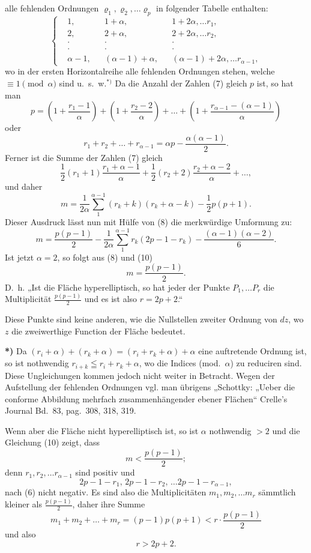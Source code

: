 \documentclass{article}
\begin{document}
alle fehlenden Ordnungen $\varrho_1, \varrho_2, \dots \varrho_p$ in folgender Tabelle enthalten:
\[
\left\{
\begin{aligned}
&1, & &1 + \alpha, & &1 + 2\alpha, \dots r_1, \\
&2, & &2 + \alpha, & &2 + 2\alpha, \dots r_2, \\
&\cdot & &\cdot & &\cdot \\
&\cdot & &\cdot & &\cdot \\
&\alpha - 1, & &(\alpha - 1) + \alpha, & &(\alpha - 1) + 2\alpha, \dots r_{\alpha-1},
\end{aligned}
\right.
\tag{7}
\]
wo in der ersten Horizontalreihe alle fehlenden Ordnungen stehen, welche $\equiv 1 \pmod \alpha$ sind u.~s.~w.${}^{*)}$ Da die Anzahl der Zahlen (7) gleich $p$ ist, so hat man
\[
p = \left(1 + \frac{r_1 - 1}{\alpha}\right) + \left(1 + \frac{r_2 - 2}{\alpha}\right) + \dots + \left(1 + \frac{r_{\alpha-1} - (\alpha - 1)}{\alpha}\right)
\]
oder
\[
r_1 + r_2 + \dots + r_{\alpha-1} = \alpha p - \frac{\alpha(\alpha - 1)}{2}.
\tag{8}
\]
Ferner ist die Summe der Zahlen (7) gleich
\[
\frac{1}{2}(r_1 + 1)\frac{r_1 + \alpha - 1}{\alpha} + \frac{1}{2}(r_2 + 2)\frac{r_2 + \alpha - 2}{\alpha} + \dots,
\]
und daher
\[
m = \frac{1}{2\alpha} \sum_1^{\alpha-1} (r_k + k)(r_k + \alpha - k) - \frac{1}{2} p(p+1).
\tag{9}
\]
Dieser Ausdruck lässt nun mit Hülfe von (8) die merkwürdige Umformung zu:
\[
m = \frac{p(p-1)}{2} - \frac{1}{2\alpha} \sum_1^{\alpha-1} r_k(2p - 1 - r_k) - \frac{(\alpha-1)(\alpha-2)}{6}.
\tag{10}
\]
Ist jetzt $\alpha = 2$, so folgt aus (8) und (10)
\[
m = \frac{p(p-1)}{2}.
\]
D.~h. „Ist die Fläche hyperelliptisch, so hat jeder der Punkte $P_1, \dots P_r$ die Multiplicität $\frac{p(p-1)}{2}$ und es ist also $r = 2p+2$.“

Diese Punkte sind keine anderen, wie die Nullstellen zweiter Ordnung von $dz$, wo $z$ die zweiwerthige Function der Fläche bedeutet.

\textbf{*)} Da $(r_i + \alpha) + (r_k + \alpha) = (r_i + r_k + \alpha) + \alpha$ eine auftretende Ordnung ist, so ist nothwendig $r_{i+k} \leqq r_i + r_k + \alpha$, wo die Indices (mod.~$\alpha$) zu reduciren sind. Diese Ungleichungen kommen jedoch nicht weiter in Betracht. Wegen der Aufstellung der fehlenden Ordnungen vgl. man übrigens „Schottky: „Ueber die conforme Abbildung mehrfach zusammenhängender ebener Flächen“ Crelle's Journal Bd.~83, pag.~308, 318, 319.

Wenn aber die Fläche nicht hyperelliptisch ist, so ist $\alpha$ nothwendig $> 2$ und die Gleichung (10) zeigt, dass
\[
m < \frac{p(p-1)}{2};
\]
denn $r_1, r_2, \dots r_{\alpha-1}$ sind positiv und
\[
2p - 1 - r_1,\, 2p - 1 - r_2,\, \dots 2p - 1 - r_{\alpha-1},
\]
nach (6) nicht negativ. Es sind also die Multiplicitäten $m_1, m_2, \dots m_r$ sämmtlich kleiner als $\frac{p(p-1)}{2}$, daher ihre Summe
\[
m_1 + m_2 + \dots + m_r = (p-1)p(p+1) < r \cdot \frac{p(p-1)}{2}
\]
und also
\[
r > 2p + 2.
\]
\end{document}

